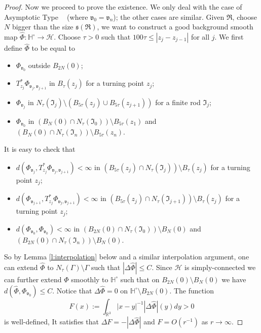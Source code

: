 \documentclass[a4paper,11pt]{amsart}
\theoremstyle{definition}
\numberwithin{equation}{section}
\newcommand{\dH}{\mathbb{H}}
\newcommand{\R}{\mathbb{R}}
\newcommand{\mv} {\mathfrak v}
\newcommand{\ms} {\mathfrak s}
\newcommand{\mI} {\mathfrak I}
\newcommand{\mR} {\mathfrak R}
\DeclareMathOperator{\AFa}{AF_\beta}
\begin{document}
\begin{proof}
Now we proceed to prove the existence. We only deal with the case of  Asymptotic Type  $\AFa$ (where $\mv_0=\mv_n$); the other cases are similar. 	Given $\mR$, choose $N$ bigger than the size $\ms(\mR)$, we want to construct a good background smooth map $\widehat{\Phi}: \dH^\circ\rightarrow \mathcal H$. Choose $\tau>0$ such that $100\tau\leq |z_j-z_{j-1}|$ for all $j$. We first define $\widehat{\Phi}$ to be equal to 
\begin{itemize}
    \item $\Phi_{\mv_0}^{\AFa}$ outside $B_{2N}(0)$;
    \item $T_{z_j}^*\Phi_{\mv_j, \mv_{j+1}}$ in $B_\tau(z_j)$ for a turning point $z_j$;
    \item $\Phi_{\mv_j}$ in $N_{\tau}(\mI_j)\setminus (B_{5\tau}(z_j)\cup B_{5\tau}(z_{j+1}))$ for a finite rod $\mI_j$;
    \item $\Phi_{\mv_0}$ in $(B_N(0)\cap N_{\tau}(\mI_0))\setminus B_{5\tau}(z_1)$ and $(B_N(0)\cap N_{\tau}(\mI_n))\setminus B_{5\tau}(z_n)$. 
\end{itemize}
It is easy to check that 
\begin{itemize}
    \item $d(\Phi_{\mv_j}, T_{z_j}^*\Phi_{\mv_j, \mv_{j+1}})<\infty$ in $(B_{5\tau}(z_j)\cap N_{\tau}(\mI_j))\setminus B_{\tau}(z_j)$ for a turning point $z_j$;
    \item $d(\Phi_{\mv_{j+1}}, T_{z_j}^*\Phi_{\mv_j, \mv_{j+1}})<\infty$ in $(B_{5\tau}(z_j)\cap N_{\tau}(\mI_{j+1}))\setminus B_{\tau}(z_j)$ for a turning point $z_j$;
    \item $d(\Phi^{\AFa}_{\mv_0},\Phi_{\mv_0})<\infty$ in $(B_{2N}(0)\cap N_{\tau}(\mI_0))\setminus B_{N}(0)$ and $(B_{2N}(0)\cap N_{\tau}(\mI_n))\setminus B_{N}(0)$. 
\end{itemize}
So by Lemma \ref{l:interpolation} below and a similar interpolation argument, one can extend $\widehat{\Phi}$ to $N_\tau(\Gamma)\setminus \Gamma$ such that $|\Delta\widehat{\Phi}|\leq C$.  Since $\mathcal H$ is simply-connected we can further extend $\widehat{\Phi}$ smoothly to $\dH^\circ$ such that on  $B_{2N}(0)\setminus B_{N}(0)$ we have $d(\widehat{\Phi}, \Phi^{\AFa}_{\mv_0})\leq C$. Notice that  $\Delta\widehat{\Phi}=0$ on $\mathbb H^\circ\setminus{B_{2N}(0)}$. The function 
	\begin{equation}\label{eq:potential v_0}
		F(x):=\int_{\R^3}|x-y|^{-1}|\Delta \widehat{\Phi}|(y)dy>0
	\end{equation}
	is well-defined, It satisfies that $\Delta F=-|\Delta\widehat{\Phi}|$ and $F=O(r^{-1})$ as $r\rightarrow\infty$. 

\end{proof}
\end{document}
